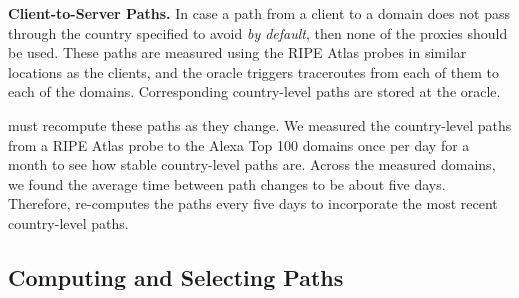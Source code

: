 {\bf Client-to-Server Paths.} In case a path from a client to a 
domain does not pass through the country specified to avoid {\it by default}, 
then none of the proxies should be used.  
These paths are measured using the RIPE Atlas probes in similar
locations as the clients, and the oracle triggers traceroutes from
each of them to each of the domains.  Corresponding country-level
paths are stored at the oracle.

\system{} must recompute these paths as they change. We measured the country-level paths from a RIPE Atlas probe to the 
Alexa Top 100 domains once per day for a month to see how stable country-level paths 
are.  Across the measured domains, we found the average time between path changes to 
be about five days.  Therefore, \system{} re-computes the paths every five days to incorporate the 
most recent country-level paths.  





\subsection{Computing and Selecting Paths}
\label{multiplex}

